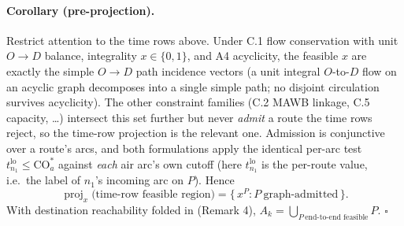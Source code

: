 \documentclass[11pt,a4paper]{article}
\theoremstyle{definition}
\begin{document}
\paragraph{Corollary (pre-projection).}
Restrict attention to the time rows above. Under C.1 flow conservation with
unit $O \to D$ balance, integrality $x \in \{0,1\}$, and A4 acyclicity, the
feasible $x$ are exactly the simple $O \to D$ path incidence vectors (a unit
integral $O$-to-$D$ flow on an acyclic graph decomposes into a single simple
path; no disjoint circulation survives acyclicity). The other constraint
families (C.2 MAWB linkage, C.5 capacity, \ldots) intersect this set further
but never \emph{admit} a route the time rows reject, so the time-row
projection is the relevant one. Admission is conjunctive over a route's arcs,
and both formulations apply the identical per-arc test $t^{\text{lo}}_{n_1}
\leq \text{CO}_a^*$ against \emph{each} air arc's own cutoff (here
$t^{\text{lo}}_{n_1}$ is the per-route value, i.e.\ the label of $n_1$'s
incoming arc on $P$). Hence
\[
\operatorname{proj}_x\big(\text{time-row feasible region}\big) =
\{\,x^P : P\ \text{graph-admitted}\,\}.
\]
With destination reachability folded in (Remark 4), $A_k = \bigcup_{P\ \text{end-to-end feasible}} P$. \hfill$\square$
\end{document}
